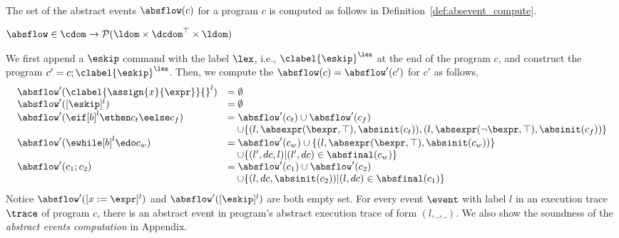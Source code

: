 \\
The set of the abstract events $\absflow(c)$ for a program $c$
is computed as follows in Definition~\ref{def:absevent_compute}.
 \begin{defn}
 \label{def:absevent_compute}
  $\absflow \in \cdom \to \mathcal{P}( \ldom \times \dcdom^{\top} \times \ldom )$
  \end{defn}
 We first append a $\eskip$ command with 
the label $\lex$, i.e., $\clabel{\eskip}^{{\lex}}$ at the end of the program $c$, and construct 
the program $c' = c;\clabel{\eskip}^{{\lex}}$.
Then, we compute the $\absflow(c) = \absflow'(c')$ for $c'$ as follows,
 {\footnotesize
 \[
   \begin{array}{ll}
      \absflow'(\clabel{\assign{x}{\expr}}{}^l)  & = \emptyset  \\
      \absflow'([\eskip]^{l})  & = \emptyset \\
      \absflow'(\eif [b]^l \ethen c_t \eelse c_f)  & =  \absflow'(c_t) \cup \absflow'(c_f)
        \\ & \quad 
        \cup \{(l, \absexpr(\bexpr, \top),  \absinit(c_t) ) ,  (l, \absexpr(\neg\bexpr, \top), \absinit(c_f)) \} \\
       \absflow'(\ewhile [b]^l \edo c_w)  & =  \absflow'(c_w) \cup \{(l, \absexpr(\bexpr, \top), \absinit(c_w)) \} 
       \\ & \quad 
       \cup \{(l', dc, l)| (l', dc) \in \absfinal(c_w) \} \\
       \absflow'(c_1 ; c_2)  & = \absflow'(c_1) \cup  \absflow'(c_2) 
       \\ & \quad 
       \cup \{ (l, dc, \absinit(c_2)) | (l, dc) \in \absfinal(c_1) \} \\
   \end{array}
   \]
   }
   Notice $\absflow'([x := \expr]^{l})$ and $\absflow'([\eskip]^{l})$ are both empty set. 
   For every event $\event$ with label $l$ in an execution trace $\trace$ of program $c$, 
   there is an abstract event in program's abstract execution trace of form $(l, \_, \_)$.  
   We also show the soundness of the \emph{abstract events computation} in Appendix.

